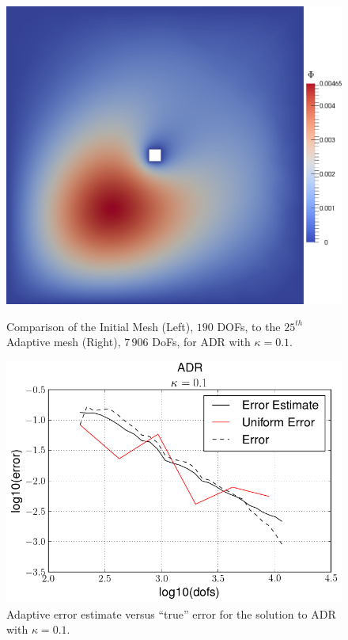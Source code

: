 \begin{test}[Diffusion Dominated ADR, $\kappa = 0.1$]
\begin{figure}[h]
\begin{minipage}[t]{0.49\textwidth}
{                \includegraphics[scale=0.1]{Figures/AdaptiveADRkappa1E-1_uDual25.png}
            }
        \end{minipage}
        \caption{Comparison of the Initial Mesh (Left), $190$ DOFs, to the
                 $25^{th}$ Adaptive mesh (Right), $7\, 906$ DoFs, for ADR with
                 $\kappa=0.1$.}
    \end{figure}

    \begin{figure}[h]
        \centering
        \includegraphics[scale=0.5]{Figures/AdaptiveADRkappa1E-1.png}
        \caption{Adaptive error estimate versus ``true'' error for the solution
            to ADR with $\kappa=0.1$.}
        \label{fig:ADRk1E-1_err}
    \end{figure}
\end{test}

